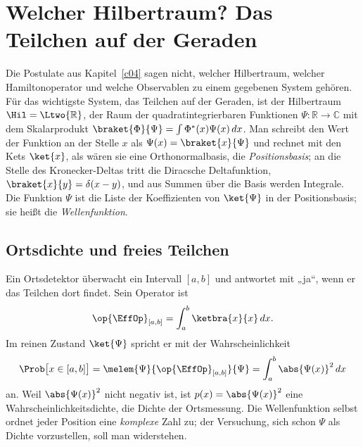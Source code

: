 %

\chapter{Welcher Hilbertraum? Das Teilchen auf der Geraden}\label{c05}

Die Postulate aus Kapitel~\ref{c04} sagen nicht, welcher Hilbertraum, welcher
Hamiltonoperator und welche Observablen zu einem gegebenen System gehören. Für das wichtigste
System, das Teilchen auf der Geraden, ist der Hilbertraum $\Hil = \Ltwo{\mathbb{R}}$, der Raum
der quadratintegrierbaren Funktionen $\Psi\colon \mathbb{R} \to \mathbb{C}$ mit dem
Skalarprodukt $\braket{\Phi}{\Psi} = \int \Phi^*(x)\Psi(x)\,dx$. Man schreibt den Wert der
Funktion an der Stelle $x$ als $\Psi(x) = \braket{x}{\Psi}$ und rechnet mit den Kets
$\ket{x}$, als wären sie eine Orthonormalbasis, die \emph{Positionsbasis}; an die Stelle des
Kronecker-Deltas tritt die Diracsche Deltafunktion, $\braket{x}{y} = \delta(x-y)$, und aus
Summen über die Basis werden Integrale. Die Funktion $\Psi$ ist die Liste der Koeffizienten
von $\ket{\Psi}$ in der Positionsbasis; sie heißt die \emph{Wellenfunktion}.

\section{Ortsdichte und freies Teilchen}\label{c05.s1}

Ein Ortsdetektor überwacht ein Intervall $[a,b]$ und antwortet mit „ja“, wenn er das Teilchen
dort findet. Sein Operator ist
\begin{equation}\label{c05.eq.ortsdetektor}
  \op{\EffOp}_{[a,b]} = \int_a^b \ketbra{x}{x}\,dx .
\end{equation}
Im reinen Zustand $\ket{\Psi}$ spricht er mit der Wahrscheinlichkeit
\begin{equation}\label{c05.eq.intervall}
  \Prob\bigl[x\in[a,b]\bigr] = \melem{\Psi}{\op{\EffOp}_{[a,b]}}{\Psi}
  = \int_a^b \abs{\Psi(x)}^2\,dx
\end{equation}
an. Weil $\abs{\Psi(x)}^2$ nicht negativ ist, ist $p(x) = \abs{\Psi(x)}^2$ eine
Wahrscheinlichkeitsdichte, die Dichte der Ortsmessung. Die Wellenfunktion selbst ordnet jeder
Position eine \emph{komplexe} Zahl zu; der Versuchung, sich schon $\Psi$ als Dichte
vorzustellen, soll man widerstehen.

